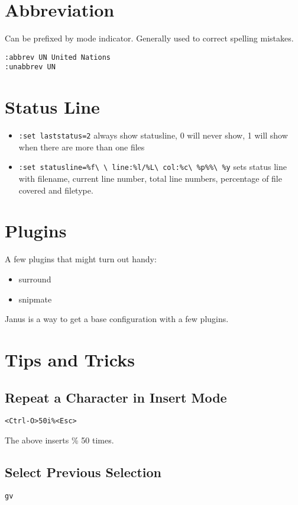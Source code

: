 \documentclass[a4paper, 12pt]{article}
\begin{document}
\section{Abbreviation}
Can be prefixed by mode indicator. Generally used to correct spelling mistakes.
\begin{verbatim}
:abbrev UN United Nations
:unabbrev UN
\end{verbatim}

\section{Status Line}
\begin{itemize}
	\item \verb|:set laststatus=2| always show statusline, 0 will never show, 1 will show when there are more than one files	
	\item \verb|:set statusline=%f\ \ line:%l/%L\ col:%c\ %p%%\ %y| sets status line with filename, current line number, total line numbers, percentage of file covered and filetype.
\end{itemize}

\section{Plugins}
A few plugins that might turn out handy:
\begin{itemize}
	\item surround	
	\item snipmate
\end{itemize}
Janus is a way to get a base configuration with a few plugins.

\section{Tips and Tricks}
\subsection{Repeat a Character in Insert Mode}
\begin{verbatim}
<Ctrl-O>50i%<Esc>
\end{verbatim}
The above inserts \% 50 times.
\subsection{Select Previous Selection}
\begin{verbatim}
gv
\end{verbatim}
\end{document}
